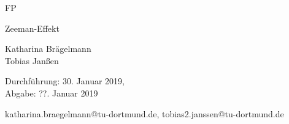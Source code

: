 \newcommand{\Titel}{Zeeman-Effekt}
\newcommand{\DatumDu}{30. Januar 2019}
\newcommand{\DatumAb}{??. Januar 2019}
\newcommand{\Autoreins}{Katharina Brägelmann}
\newcommand{\Emaileins}{katharina.braegelmann@tu-dortmund.de}
\newcommand{\Autorzwei}{Tobias Janßen}
\newcommand{\Emailzwei}{tobias2.janssen@tu-dortmund.de}



\begin{titlepage}

\begin{center} \large

  FP
  \vspace*{2.5cm}

  {\huge \Titel}
  \vspace*{3cm}

  \Autoreins
  \\\Autorzwei
  \vspace*{1.5cm}

  Durchführung: \DatumDu,\\
  Abgabe: \DatumAb
  \vspace*{10cm}


  \Emaileins, \Emailzwei


\end{center}
\end{titlepage}
